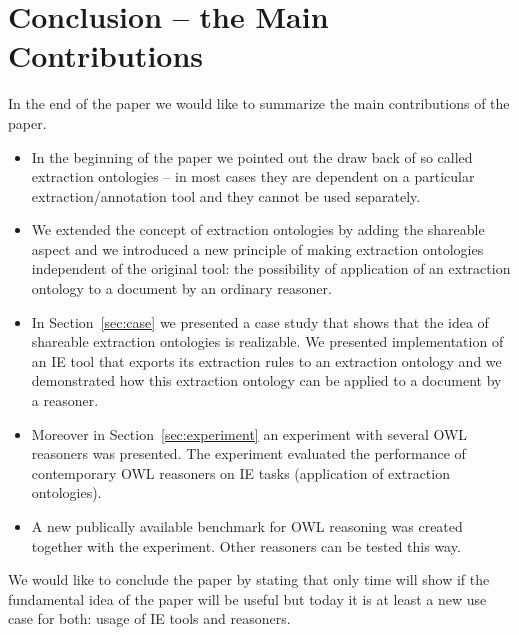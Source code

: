 \section{Conclusion -- the Main Contributions}

In the end of the paper we would like to summarize the main contributions of the paper.

\begin{itemize}
	\item In the beginning of the paper we pointed out the draw back of so called extraction ontologies -- in most cases they are dependent on a particular extraction/annotation tool and they cannot be used separately.	
	\item We extended the concept of extraction ontologies by adding the shareable aspect and we introduced a new principle of making extraction ontologies independent of the original tool: the possibility of application of an extraction ontology to a document by an ordinary reasoner.
	\item In Section~\ref{sec:case} we presented a case study that shows that the idea of shareable extraction ontologies is realizable. We presented implementation of an IE tool that exports its extraction rules to an extraction ontology and we demonstrated how this extraction ontology can be applied to a document by a reasoner.
	\item Moreover in Section~\ref{sec:experiment} an experiment with several OWL reasoners was presented. The experiment evaluated the performance of contemporary OWL reasoners on IE tasks (application of extraction ontologies).  
	\item A new publically available benchmark for OWL reasoning was created together with the experiment. Other reasoners can be tested this way.
\end{itemize}
   

We would like to conclude the paper by stating that only time will show if the fundamental idea of the paper will be useful but today it is at least a new use case for both: usage of IE tools and reasoners.
